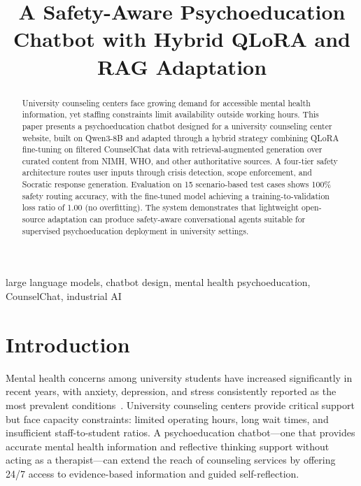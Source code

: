 \documentclass[conference]{IEEEtran}
\begin{document}
\title{A Safety-Aware Psychoeducation Chatbot with Hybrid QLoRA and RAG Adaptation}

\author{
}

\maketitle

\begin{abstract}
University counseling centers face growing demand for accessible mental health information, yet staffing constraints limit availability outside working hours. This paper presents a psychoeducation chatbot designed for a university counseling center website, built on Qwen3-8B and adapted through a hybrid strategy combining QLoRA fine-tuning on filtered CounselChat data with retrieval-augmented generation over curated content from NIMH, WHO, and other authoritative sources. A four-tier safety architecture routes user inputs through crisis detection, scope enforcement, and Socratic response generation. Evaluation on 15 scenario-based test cases shows 100\% safety routing accuracy, with the fine-tuned model achieving a training-to-validation loss ratio of 1.00 (no overfitting). The system demonstrates that lightweight open-source adaptation can produce safety-aware conversational agents suitable for supervised psychoeducation deployment in university settings.
\end{abstract}

\begin{IEEEkeywords}
large language models, chatbot design, mental health psychoeducation, CounselChat, industrial AI
\end{IEEEkeywords}

\section{Introduction}

Mental health concerns among university students have increased significantly in recent years, with anxiety, depression, and stress consistently reported as the most prevalent conditions~\cite{who_mental}. University counseling centers provide critical support but face capacity constraints: limited operating hours, long wait times, and insufficient staff-to-student ratios. A psychoeducation chatbot---one that provides accurate mental health information and reflective thinking support without acting as a therapist---can extend the reach of counseling services by offering 24/7 access to evidence-based information and guided self-reflection.
\end{document}
